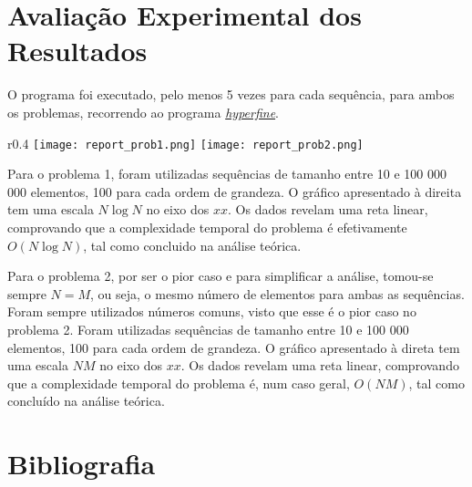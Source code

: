 \documentclass[12pt,a4paper]{article}
\begin{document}
  \section{Avaliação Experimental dos Resultados}

  O programa foi executado, pelo menos 5 vezes para cada sequência, para ambos os problemas, recorrendo ao programa \href{https://github.com/sharkdp/hyperfine}{\textit{hyperfine}}.

  \begin{wrapfigure}{r}{0.4\textwidth}
    \centering
    \texttt{[image: report\_prob1.png]}
    \texttt{[image: report\_prob2.png]}
  \end{wrapfigure}

  Para o problema 1, foram utilizadas sequências de tamanho entre 10 e 100 000 000 elementos, 100 para cada ordem de grandeza.
  O gráfico apresentado à direita tem uma escala $N \log N$ no eixo dos $xx$.
  Os dados revelam uma reta linear, comprovando que a complexidade temporal do problema é efetivamente $O(N\log N)$, tal como concluido na análise teórica.

  Para o problema 2, por ser o pior caso e para simplificar a análise, tomou-se sempre $N = M$, ou seja, o mesmo número de elementos para ambas as sequências.
  Foram sempre utilizados números comuns, visto que esse é o pior caso no problema 2.
  Foram utilizadas sequências de tamanho entre 10 e 100 000 elementos, 100 para cada ordem de grandeza.
  O gráfico apresentado à direta tem uma escala $NM$ no eixo dos $xx$.
  Os dados revelam uma reta linear, comprovando que a complexidade temporal do problema é, num caso geral, $O(NM)$, tal como concluído na análise teórica.

  \section{Bibliografia}

  \printbibliography
\end{document}
